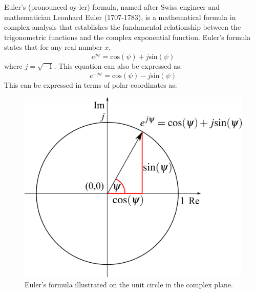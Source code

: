 \documentclass[12pt,letter]{article}
\begin{document}
		\begin{review}
		
			Euler's (pronounced oy-ler) formula, named after Swiss engineer and mathematician Leonhard Euler (1707-1783), is a mathematical formula in complex analysis that establishes the fundamental relationship between the trigonometric functions and the complex exponential function. Euler's formula states that for any real number $x$,
			\begin{equation}
				e^{j\psi} = \text{cos}(\psi) + j \text{sin}(\psi)
			\end{equation}		
			where $j=\sqrt{-1}$. This equation can also be expressed as:
			\begin{equation}
				e^{-j\psi} = \text{cos}(\psi) - j \text{sin}(\psi)
			\end{equation}	
			This can be expressed in terms of polar coordinates as:				
			\begin{figure}[H]
				\centering
				\includegraphics[]{../figures/Eulers_formula.png}
				\caption{Euler's formula illustrated on the unit circle in the complex plane.}
			\end{figure}
		\end{review}
\end{document}
